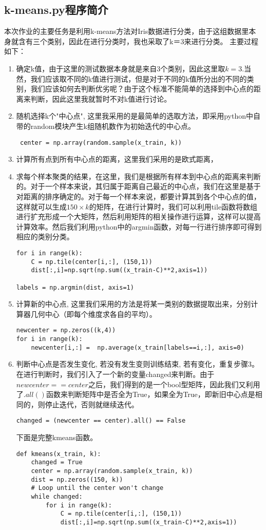 \documentclass[a4paper, 1pt]{article}
\newcommand{\xiaosihao}{\fontsize{12pt}{\baselineskip}\selectfont}
\begin{document}
\begin{spacing}{1.0}
\section{\xiaosihao k-means.py程序简介}
本次作业的主要任务是利用k-means方法对Iris数据进行分类，由于这组数据里本身就含有三个类别，因此在进行分类时，我也采取了k＝3来进行分类。
主要过程如下：\\
\begin{enumerate}
\item 确定k值，由于这里的测试数据本身就是来自3个类别，因此这里取$k=3$.当然，我们应该取不同的k值进行测试，但是对于不同的k值所分出的不同的类别，我们应该如何去判断优劣呢？由于这个标准不能简单的选择到中心点的距离来判断，因此这里我就暂时不对k值进行讨论。
\item 随机选择k个"中心点", 这里我采用的是最简单的选取方法，即采用python中自带的random模块产生k组随机数作为初始迭代的中心点。
\begin{lstlisting}
 center = np.array(random.sample(x_train, k))
\end{lstlisting}
\item 计算所有点到所有中心点的距离，这里我们采用的是欧式距离，
\item  求每个样本聚类的结果，在这里，我们是根据所有样本到中心点的距离来判断的。对于一个样本来说，其归属于距离自己最近的中心点，我们在这里是基于对距离的排序确定的。对于每一个样本来说，都要计算其到各个中心点的值，这样就可以生成$150\times k$的矩阵，在进行计算时，我们可以利用tile函数将数组进行扩充形成一个大矩阵，然后利用矩阵的相关操作进行运算，这样可以提高计算效率。然后我们利用python中的argmin函数，对每一行进行排序即可得到相应的类别分类。

\begin{lstlisting}
for i in range(k):
    C = np.tile(center[i,:], (150,1))
    dist[:,i]=np.sqrt(np.sum((x_train-C)**2,axis=1))

labels = np.argmin(dist, axis=1)
\end{lstlisting}
\item 计算新的中心点, 这里我们采用的方法是将某一类别的数据提取出来，分别计算器几何中心（即每个维度求各自的平均）。
\begin{lstlisting}
newcenter = np.zeros((k,4))
for i in range(k):
    newcenter[i,:] =  np.average(x_train[labels==i,:], axis=0)
\end{lstlisting}
\item 判断中心点是否发生变化, 若没有发生变则训练结束, 若有变化，重复步骤3。在进行判断时，我们引入了一个新的变量changed来判断。由于$newcenter==center$之后，我们得到的是一个bool型矩阵，因此我们又利用了$.all()$函数来判断矩阵中是否全为True，如果全为True，即新旧中心点是相同的，则停止迭代，否则就继续迭代。
\begin{lstlisting}
changed = (newcenter == center).all() == False
\end{lstlisting}
下面是完整kmeans函数。
\begin{lstlisting}
def kmeans(x_train, k):
    changed = True
    center = np.array(random.sample(x_train, k))
    dist = np.zeros((150, k))
    # Loop until the center won't change
    while changed:
        for i in range(k):
            C = np.tile(center[i,:], (150,1))
            dist[:,i]=np.sqrt(np.sum((x_train-C)**2,axis=1))


\end{lstlisting}
\end{enumerate}
\end{spacing}
\end{document}
